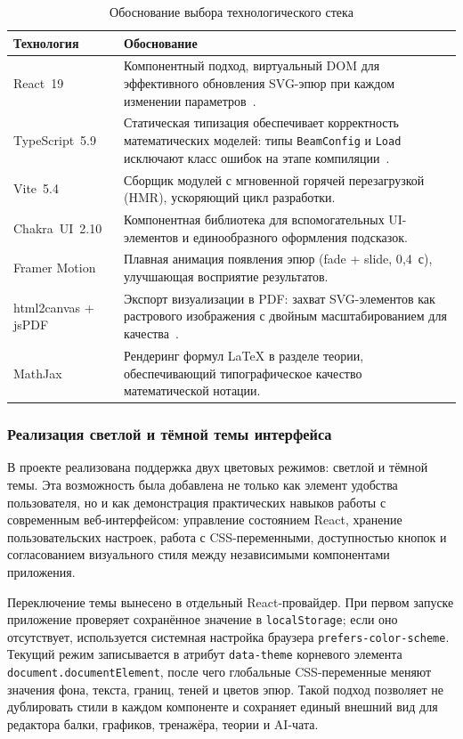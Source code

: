 \begin{table}[H]
\caption{Обоснование выбора технологического стека}\label{tab:tech_stack}
\begin{tabularx}{\textwidth}{|p{3.5cm}|X|}
\hline
\textbf{Технология} & \textbf{Обоснование} \\
\hline
React~19 & Компонентный подход, виртуальный DOM для эффективного обновления SVG-эпюр при каждом изменении параметров~\cite{banks2020}. \\
\hline
TypeScript~5.9 & Статическая типизация обеспечивает корректность математических моделей: типы \texttt{BeamConfig} и \texttt{Load} исключают класс ошибок на этапе компиляции~\cite{cherny2019}. \\
\hline
Vite~5.4 & Сборщик модулей с мгновенной горячей перезагрузкой (HMR), ускоряющий цикл разработки. \\
\hline
Chakra~UI~2.10 & Компонентная библиотека для вспомогательных UI-элементов и единообразного оформления подсказок. \\
\hline
Framer Motion & Плавная анимация появления эпюр (fade + slide, 0{,}4~с), улучшающая восприятие результатов. \\
\hline
html2canvas + jsPDF & Экспорт визуализации в PDF: захват SVG-элементов как растрового изображения с двойным масштабированием для качества~\cite{murray2017}. \\
\hline
MathJax & Рендеринг формул LaTeX в разделе теории, обеспечивающий типографическое качество математической нотации. \\
\hline
\end{tabularx}
\end{table}

\subsubsection{Реализация светлой и тёмной темы интерфейса}

В проекте реализована поддержка двух цветовых режимов: светлой и тёмной темы. Эта возможность была добавлена не только как элемент удобства пользователя, но и как демонстрация практических навыков работы с современным веб-интерфейсом: управление состоянием React, хранение пользовательских настроек, работа с CSS-переменными, доступностью кнопок и согласованием визуального стиля между независимыми компонентами приложения.

Переключение темы вынесено в отдельный React-провайдер. При первом запуске приложение проверяет сохранённое значение в \texttt{localStorage}; если оно отсутствует, используется системная настройка браузера \texttt{prefers-color-scheme}. Текущий режим записывается в атрибут \texttt{data-theme} корневого элемента \texttt{document.documentElement}, после чего глобальные CSS-переменные меняют значения фона, текста, границ, теней и цветов эпюр. Такой подход позволяет не дублировать стили в каждом компоненте и сохраняет единый внешний вид для редактора балки, графиков, тренажёра, теории и AI-чата.


